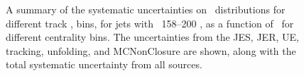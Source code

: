 \begin{figure}
{\begin{tabular}{cc}
\end{tabular} }
   \caption{A summary of the systematic uncertainties on \RDptr\ distributions for different track \pt, bins, for jets with \pt\ 158--200  \GeV, as a function of \rvar\ for different centrality bins. The uncertainties from the JES, JER, UE, tracking, unfolding, and MCNonClosure are shown, along with the total systematic uncertainty from all sources. }
      \label{fig:rdptr_sys_uncert_A1}
\end{figure}

 \begin{figure}
\end{figure}
